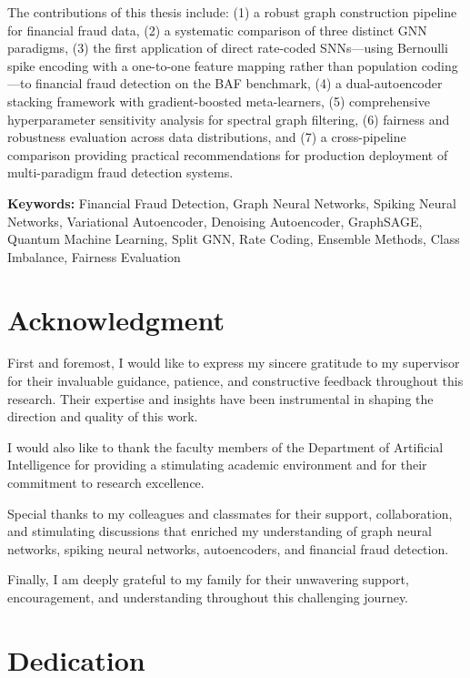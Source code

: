 The contributions of this thesis include: (1) a robust graph construction pipeline for financial fraud data, (2) a systematic comparison of three distinct GNN paradigms, (3) the first application of direct rate-coded SNNs---using Bernoulli spike encoding with a one-to-one feature mapping rather than population coding---to financial fraud detection on the BAF benchmark, (4) a dual-autoencoder stacking framework with gradient-boosted meta-learners, (5) comprehensive hyperparameter sensitivity analysis for spectral graph filtering, (6) fairness and robustness evaluation across data distributions, and (7) a cross-pipeline comparison providing practical recommendations for production deployment of multi-paradigm fraud detection systems.

\vspace{1cm}
\noindent\textbf{Keywords:} Financial Fraud Detection, Graph Neural Networks, Spiking Neural Networks, Variational Autoencoder, Denoising Autoencoder, GraphSAGE, Quantum Machine Learning, Split GNN, Rate Coding, Ensemble Methods, Class Imbalance, Fairness Evaluation

\chapter*{Acknowledgment}

First and foremost, I would like to express my sincere gratitude to my supervisor for their invaluable guidance, patience, and constructive feedback throughout this research. Their expertise and insights have been instrumental in shaping the direction and quality of this work.

I would also like to thank the faculty members of the Department of Artificial Intelligence for providing a stimulating academic environment and for their commitment to research excellence.

Special thanks to my colleagues and classmates for their support, collaboration, and stimulating discussions that enriched my understanding of graph neural networks, spiking neural networks, autoencoders, and financial fraud detection.

Finally, I am deeply grateful to my family for their unwavering support, encouragement, and understanding throughout this challenging journey.

\chapter*{Dedication}

